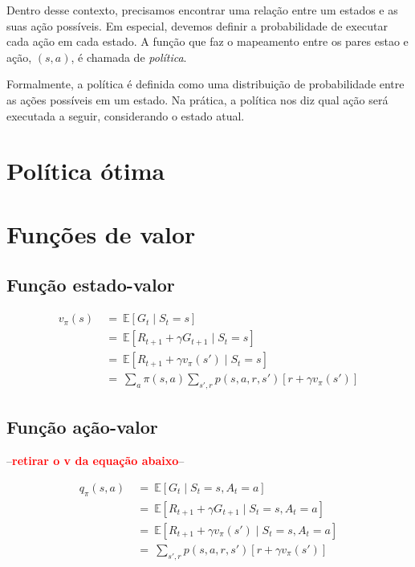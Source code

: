 \documentclass{article}
\newcommand{\todo}[1]{ --\textcolor{red}{\textbf{#1}}--}
\begin{document}
        Dentro desse contexto, precisamos encontrar uma relação entre um estados e as suas ação possíveis. Em especial, devemos definir a probabilidade de executar cada ação em cada estado. A função que faz o mapeamento entre os pares estao e ação, $(s, a)$, é chamada de \emph{política}. 
        
        Formalmente, a política é definida como uma distribuição de probabilidade entre as ações possíveis em um estado. Na prática, a política nos diz qual ação será executada a seguir, considerando o estado atual.
    
        \section{Política ótima}
        
    
    \section{Funções de valor}
        
        \subsection{Função estado-valor}
        
            \begin{equation}
            \begin{split}
                v_{\pi}(s) & \ = \ \mathbb{E}[G_t \mid S_t = s] \\
                & \ = \ \mathbb{E}[R_{t+1} + \gamma G_{t+1} \mid S_t = s] \\
                & \ = \ \mathbb{E}[R_{t+1} + \gamma v_{\pi}(s') \mid S_t = s] \\
                & \ = \ \sum_{a} \pi(s,a) \sum_{s', r} p(s, a, r, s') [r + \gamma v_{\pi}(s')]
            \end{split}
            \end{equation}
        
        \subsection{Função ação-valor}
        
            \todo{retirar o v da equação abaixo}

            \begin{equation}            
            \begin{split}
                q_{\pi}(s, a) & \ = \ \mathbb{E}[G_t \mid S_t = s, A_t = a] \\
                & \ = \ \mathbb{E}[R_{t+1} + \gamma G_{t+1} \mid S_t = s, A_t = a] \\
                & \ = \ \mathbb{E}[R_{t+1} + \gamma v_{\pi}(s') \mid S_t = s, A_t = a] \\
                & \ = \ \sum_{s', r} p(s, a, r, s') [r + \gamma v_{\pi}(s')]
            \end{split}
            \end{equation}
        
\end{document}
